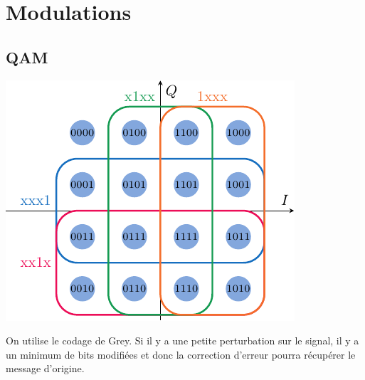 \documentclass[resume]{subfiles}
\begin{document}
\section{Modulations}
\subsection{QAM}
\begin{center}
\includegraphics[scale=0.75]{drwg_5.pdf}
\end{center}
On utilise le codage de Grey. Si il y a une petite perturbation sur le signal, il y a un minimum de bits modifiées et donc la correction d'erreur pourra récupérer le message d'origine.
\end{document}
